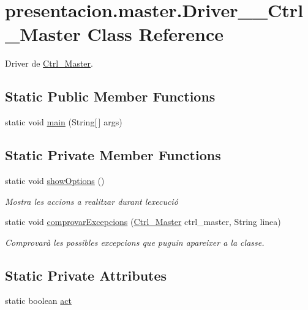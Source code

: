 \hypertarget{classpresentacion_1_1master_1_1Driver____Ctrl__Master}{}\section{presentacion.\+master.\+Driver\+\_\+\+\_\+\+Ctrl\+\_\+\+Master Class Reference}
\label{classpresentacion_1_1master_1_1Driver____Ctrl__Master}


Driver de \hyperlink{classpresentacion_1_1master_1_1Ctrl__Master}{Ctrl\+\_\+\+Master}.  


\subsection*{Static Public Member Functions}
\begin{DoxyCompactItemize}
\item 
static void \hyperlink{classpresentacion_1_1master_1_1Driver____Ctrl__Master_a4965d356e9bd0a56c753c3a2d296b7cc}{main} (String\mbox{[}$\,$\mbox{]} args)
\end{DoxyCompactItemize}
\subsection*{Static Private Member Functions}
\begin{DoxyCompactItemize}
\item 
static void \hyperlink{classpresentacion_1_1master_1_1Driver____Ctrl__Master_a2e2f7cbdade58f6871d3695e24b08305}{show\+Options} ()
\begin{DoxyCompactList}\small\item\em Mostra les accions a realitzar durant l\textquotesingle{}execució \end{DoxyCompactList}\item 
static void \hyperlink{classpresentacion_1_1master_1_1Driver____Ctrl__Master_ae522ded3194d6be2aa68cc60b7590716}{comprovar\+Excepcions} (\hyperlink{classpresentacion_1_1master_1_1Ctrl__Master}{Ctrl\+\_\+\+Master} ctrl\+\_\+master, String linea)
\begin{DoxyCompactList}\small\item\em Comprovarà les possibles excepcions que puguin apareixer a la classe. \end{DoxyCompactList}\end{DoxyCompactItemize}
\subsection*{Static Private Attributes}
\begin{DoxyCompactItemize}
\item 
static boolean \hyperlink{classpresentacion_1_1master_1_1Driver____Ctrl__Master_a76b217371c1036ed3e4e46d2c8d427c4}{act}
\end{DoxyCompactItemize}


